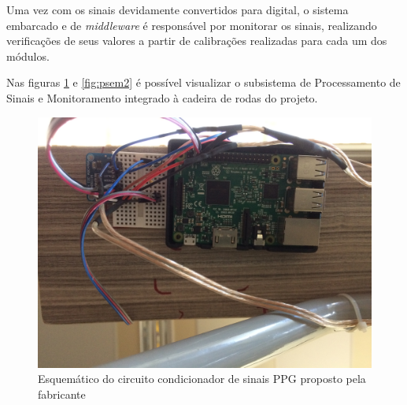 Uma vez com os sinais devidamente convertidos para digital, o sistema embarcado e de \textit{middleware}
é responsável por monitorar os sinais, realizando verificações de seus valores a partir de calibrações
realizadas para cada um dos módulos.

Nas figuras \ref{fig:psem1} e \ref{fig:psem2} é possível visualizar o subsistema 
de Processamento de Sinais e Monitoramento integrado à cadeira de rodas do 
projeto.

\begin{figure}[h!]
    \begin{center}
        \includegraphics[scale=0.07]{figuras/psem1.jpg}
    \end{center}
    \caption{Esquemático do circuito condicionador de sinais PPG proposto pela fabricante}
    \label{fig:psem1}
\end{figure}

